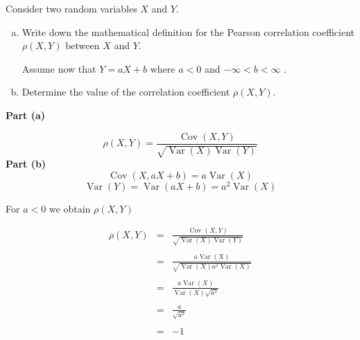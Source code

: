 \documentclass[a4paper,12pt]{article}
\begin{document}
	
	\large
	\noindent Consider two random variables $X$ and $Y$.
	\begin{enumerate}[(a)]
		\item 
		Write down the mathematical definition for the Pearson correlation coefficient
		$\rho(X, Y)$ between $X$ and $Y$.
		
		\medskip
		Assume now that $Y = aX + b$ where $a < 0$ and $-\infty <  b < \infty$ .
		\item 
		
		Determine the value of the correlation coefficient $\rho(X, Y)$.
	\end{enumerate}
	
	
	\noindent \textbf{Part (a)}
	
	\[ \rho ( X , Y ) = \frac{\operatorname{Cov}(X,Y) }{ \sqrt{ \operatorname{Var}(X)\operatorname{Var}(Y)}} \]
	\bigskip 
	\noindent \textbf{Part (b)}
	\[\operatorname{Cov}(X, aX + b) = a\operatorname{Var}(X) \]
	\[ \operatorname{Var}(Y) = \operatorname{Var}(aX + b) = a^2 \operatorname{Var}(X) \]
	
	\noindent For $a < 0$ we obtain $\rho(X, Y)$ 
	
	\begin{eqnarray*} 
		\rho(X, Y) 
		&=& \frac{\operatorname{Cov}(X,Y) }{ \sqrt{ \operatorname{Var}(X)\operatorname{Var}(Y)}}\\
		& & \\
		&=& \frac{a\operatorname{Var}(X)  }{ \sqrt{ \operatorname{Var}(X) a^2 \operatorname{Var}(X)}}\\
		& & \\
		&=& \frac{a\operatorname{Var}(X)  }{ \operatorname{Var}(X) \sqrt{  a^2 }}\\
		& & \\
		&=& \frac{a}{\sqrt{  a^2 }}\\
		& & \\
		&=& -1
	\end{eqnarray*}
	
	
\end{document}
